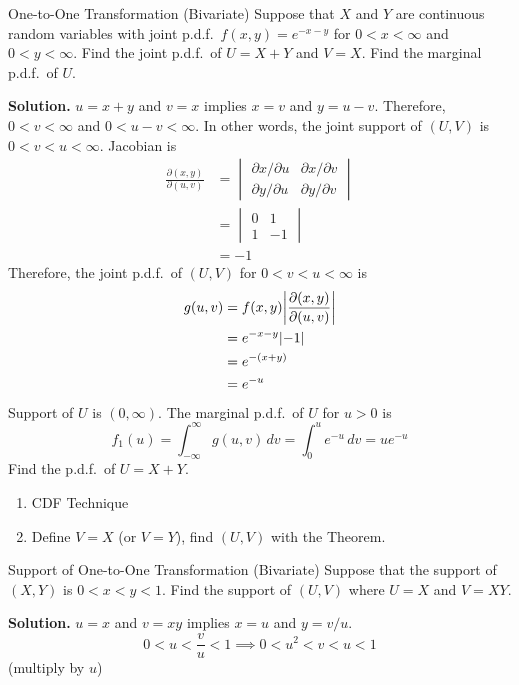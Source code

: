 \begin{Example}{One-to-One Transformation (Bivariate)}{}
    Suppose that $ X $ and $ Y $ are continuous random variables with
    joint p.d.f.\ $ f(x,y)=e^{-x-y} $ for $ 0<x<\infty $
    and $ 0<y<\infty $. Find the joint p.d.f.\ of
    $ U=X+Y $ and $ V=X $. Find the marginal p.d.f.\ of $ U $.

    \textbf{Solution.} $ u=x+y $ and $ v=x $ implies
    $ x=v $ and $ y=u-v $. Therefore, $ 0<v<\infty $
    and $ 0<u-v<\infty $. In other words,
    the joint support of $ (U,V) $ is
    $ 0<v<u<\infty $. Jacobian is
    \begin{align*}
        \frac{\partial(x,y)}{\partial(u,v)}
         & =\begin{vmatrix}
            \partial x/\partial u & \partial x/\partial v \\
            \partial y/\partial u & \partial y/\partial v
        \end{vmatrix} \\
         & =\begin{vmatrix}
            0 & 1  \\
            1 & -1
        \end{vmatrix} \\
         & =-1
    \end{align*}
    Therefore, the joint p.d.f.\ of $ (U,V) $ for $ 0<v<u<\infty $ is
    \begin{align*}
        g(u,v)
         & =f(x,y)\abs*{\frac{\partial(x,y)}{\partial(u,v)}} \\
         & =e^{-x-y}\abs{-1}                                 \\
         & =e^{-(x+y)}                                       \\
         & =e^{-u}
    \end{align*}
    Support of $ U $ is $ (0,\infty) $.
    The marginal p.d.f.\ of $ U $ for $ u>0 $ is
    \[ f_1(u)=\int_{-\infty}^{\infty} g(u,v)\, d{v}=
        \int_{0}^{u} e^{-u}\, d{v}=u e^{-u} \]
    Find the p.d.f.\ of $ U=X+Y $.
    \begin{enumerate}
        \item CDF Technique
        \item Define $ V=X $ (or $ V=Y $),
              find $ (U,V) $ with the Theorem.
    \end{enumerate}
\end{Example}
\begin{Example}{Support of One-to-One Transformation (Bivariate)}{}
    Suppose that the support of $ (X,Y) $ is
    $ 0<x<y<1 $. Find the support of $ (U,V) $
    where $ U=X $ and $ V=XY $.

    \textbf{Solution.} $ u=x $ and $ v=xy $
    implies $ x=u $ and $ y=v/u $.
    \[ 0<u<\frac{v}{u} <1\implies 0<u^2<v<u<1 \]
    (multiply by $ u $)
\end{Example}
